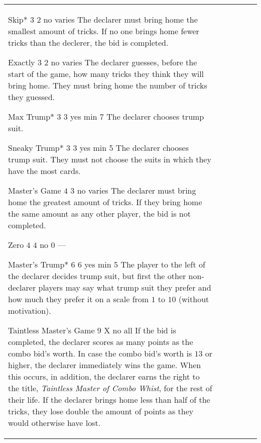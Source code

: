 \begin{table}
\begin{center}
\begin{tabularx}{\textwidth}{lcccc|X}
				\standardBidItem%
				{Skip*}
				{$3$}
				{$2$}
				{no}
				{varies}
				{%
					The declarer must bring home the smallest amount of tricks. If no one brings home fewer tricks than the declerer, the bid is completed.
				}

				\standardBidItem%
				{Exactly}
				{$3$}
				{$2$}
				{no}
				{varies}
				{%
					The declarer guesses, before the start of the game, how many tricks they think they will bring home. They must bring home the number of tricks they guessed.
				}

				\standardBidItem%
				{Max Trump*}
				{$3$}
				{$3$}
				{yes}
				{min 7}
				{%
					The declarer chooses trump suit.
				}

				\standardBidItem%
				{Sneaky Trump*}
				{$3$}
				{$3$}
				{yes}
				{min 5}
				{%
					The declarer chooses trump suit. They must not choose the suits in which they have the most cards.
				}

				\standardBidItem%
				{Master's Game}
				{$4$}
				{$3$}
				{no}
				{varies}
				{%
					The declarer must bring home the greatest amount of tricks. If they bring home the same amount as any other player, the bid is not completed. 
				}

				\standardBidItem%
				{Zero}
				{$4$}
				{$4$}
				{no}
				{0}
				{%
					---
				}

				\standardBidItem%
				{Master's Trump*}
				{$6$}
				{$6$}
				{yes}
				{min 5}
				{%
					The player to the left of the declarer decides trump suit, but first the other non-declarer players may say what trump suit they prefer and how much they prefer it on a scale from $1$ to $10$ (without motivation).
				}

				\standardBidItem%
				{Taintless Master's Game}
				{$9$}
				{X}
				{no}
				{all}
				{%
					If the bid is completed, the declarer scores as many points as the combo bid's worth. In case the combo bid's worth is $13$ or higher, the declarer immediately wins the game. When this occurs, in addition, the declarer earns the right to the title, \emph{Taintless Master of Combo Whist}, for the rest of their life. If the declarer brings home less than half of the tricks, they lose double the amount of points as they would otherwise have lost.
				}
		\end{tabularx}
	\end{center}
\end{table}
